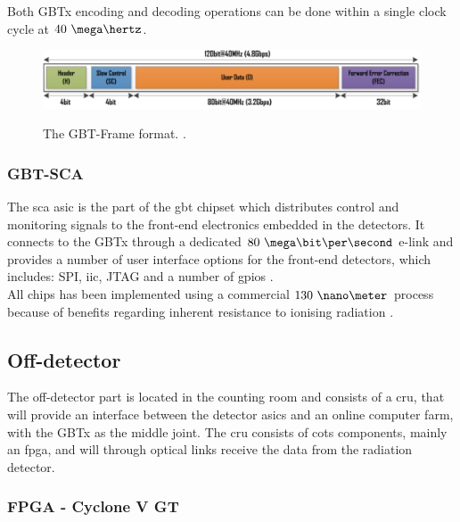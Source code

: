 \documentclass[main.tex]{subfiles}
\begin{document}
Both GBTx encoding and decoding operations can be done within a single clock cycle at $40~\mega\hertz$. 
 
\begin{figure} %
\includegraphics[width=\linewidth]{../img/gbtframe}  \\[0.1 cm]
\caption{The GBT-Frame format. \cite[Figure 4]{gbt_fpga}.}
\label{fig:gbtframe}
\end{figure}

\subsubsection{GBT-SCA}

The \gls{sca} \gls{asic} is the part of the \gls{gbt} chipset which distributes control and monitoring signals to the front-end electronics embedded in the detectors. It connects to the GBTx through a dedicated $80~\mega\bit\per\second$ e-link and provides a number of user interface options for the front-end detectors, which includes: SPI, \acrshort{iic}, JTAG and a number of \acrshort{gpio}s \cite{gbtsca15}. \\

\noindent
All chips has been implemented using a commercial $130~\nano\meter$ process because of benefits regarding inherent resistance to ionising radiation \cite{gbtpro10}.

\subsection{Off-detector}
The off-detector part is located in the counting room and consists of a \gls{cru}, that will provide an interface between the detector \acrshort{asic}s and an online computer farm, with the GBTx as the middle joint. The \gls{cru} consists of \gls{cots} components, mainly an \gls{fpga}, and will through optical links receive the data from the radiation detector.

\subsubsection{FPGA - Cyclone V GT} \label{sec:cyclone}
\end{document}
